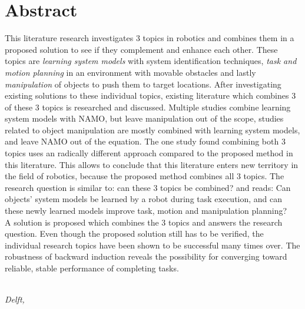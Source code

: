 \chapter*{Abstract}
This literature research investigates 3 topics in robotics and combines them in a proposed solution to see if they complement and enhance each other. These topics are \textit{learning system models} with system identification techniques, \textit{task and motion planning} in an environment with movable obstacles and lastly \textit{manipulation} of objects to push them to target locations. After investigating existing solutions to these individual topics, existing literature which combines 3 of these 3 topics is researched and discussed. Multiple studies combine learning system models with \ac{NAMO}, but leave manipulation out of the scope, studies related to object manipulation are mostly combined with learning system models, and leave \ac{NAMO} out of the equation. The one study found combining both 3 topics uses an radically different approach compared to the proposed method in this literature. This allows to conclude that this literature enters new territory in the field of robotics, because the proposed method combines all 3 topics. The research question is similar to: can these 3 topics be combined? and reads: Can objects’ system models be learned by a robot during task execution, and can these newly learned models improve task, motion and manipulation planning? \\

A solution is proposed which combines the 3 topics and answers the research question. Even though the proposed solution still has to be verified, the individual research topics have been shown to be successful many times over. The robustness of backward induction reveals the possibility for converging toward  reliable, stable performance of completing tasks. 

\begin{flushright}
{\makeatletter\itshape
    \@author \\
    Delft, \monthname{} \the\year{}
\makeatother}
\end{flushright}
